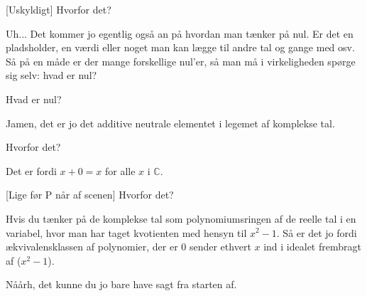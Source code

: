 \documentclass[a4paper,11pt]{article}
\begin{document}
\begin{sketch}
[Uskyldigt] Hvorfor det?

 Uh... Det kommer jo egentlig også an på hvordan man tænker på nul. Er det en pladsholder, en værdi eller noget man kan lægge til andre tal og gange med osv.  Så på en måde er der mange forskellige nul’er, så man må i virkeligheden spørge sig selv: hvad er nul? 

 Hvad er nul?

 Jamen, det er jo det additive neutrale elementet i legemet af komplekse tal. 


 Hvorfor det?

 Det er fordi $x+0=x$ for alle $x$ i $\mathbb{C}$. 


[Lige før P når af scenen] Hvorfor det?

 Hvis du tænker på de komplekse tal som polynomiumsringen af de reelle tal i en variabel, hvor man har taget kvotienten med hensyn til $x^2-1$. Så er det jo fordi ækvivalensklassen af polynomier, der er $0$ sender ethvert $x$ ind i idealet frembragt af ($x^2-1$). 

 Nåårh, det kunne du jo bare have sagt fra starten af.

\end{sketch}
\end{document}
